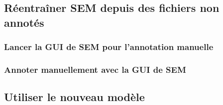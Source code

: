 \documentclass[12pt]{article}
\begin{document}
        \subsection{Réentraîner SEM depuis des fichiers non annotés}
        \label{sec:retrain-sem-unannotated}
        
        
            \subsubsection{Lancer la GUI de SEM pour l'annotation manuelle}
            \label{subsubsec:launch-sem-annotation-gui}
            
        
            \subsubsection{Annoter manuellement avec la GUI de SEM}
            \label{subsubsec:manually-annotate-with-sem}
            
        
        \subsection{Utiliser le nouveau modèle}
        \label{subsec:use-new-model}
        
    
    \printbibliography
\end{document}
